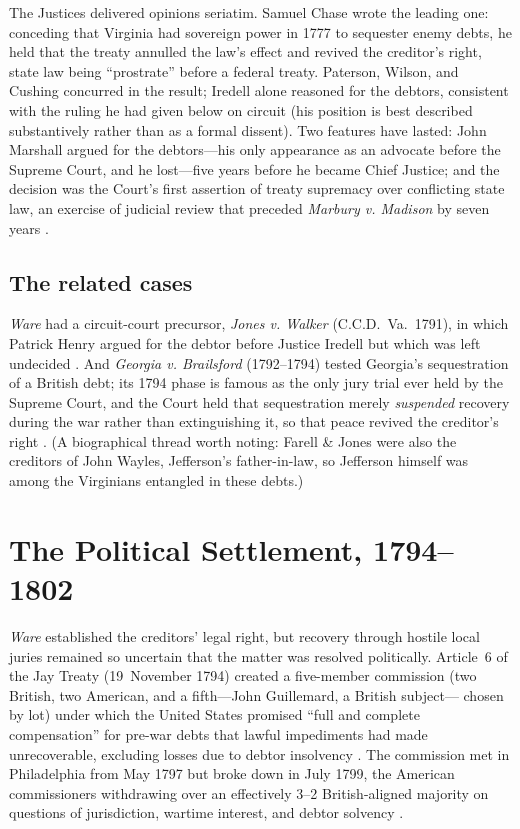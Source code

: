 \documentclass[12pt]{article}
\begin{document}
The Justices delivered opinions seriatim. Samuel Chase wrote the leading one:
conceding that Virginia had sovereign power in 1777 to sequester enemy debts, he
held that the treaty annulled the law's effect and revived the creditor's right,
state law being ``prostrate'' before a federal treaty. Paterson, Wilson, and
Cushing concurred in the result; Iredell alone reasoned for the debtors,
consistent with the ruling he had given below on circuit (his position is best
described substantively rather than as a formal dissent). Two features have lasted:
John Marshall argued for the debtors---his only appearance as an advocate before
the Supreme Court, and he lost---five years before he became Chief Justice; and the
decision was the Court's first assertion of treaty supremacy over conflicting
state law, an exercise of judicial review that preceded \emph{Marbury v. Madison}
by seven years \citep{warevhylton1796, hobson1996great, currie1985constitution,
goebel1971history}.

\subsection{The related cases}

\emph{Ware} had a circuit-court precursor, \emph{Jones v. Walker} (C.C.D.\ Va.\
1791), in which Patrick Henry argued for the debtor before Justice Iredell but
which was left undecided \citep{jonesvwalker1791, marshallpapers1987}. And
\emph{Georgia v. Brailsford} (1792--1794) tested Georgia's sequestration of a
British debt; its 1794 phase is famous as the only jury trial ever held by the
Supreme Court, and the Court held that sequestration merely \emph{suspended}
recovery during the war rather than extinguishing it, so that peace revived the
creditor's right \citep{georgiavbrailsford1794}. (A biographical thread worth
noting: Farell \& Jones were also the creditors of John Wayles, Jefferson's
father-in-law, so Jefferson himself was among the Virginians entangled in these
debts.)

\section{The Political Settlement, 1794--1802}
\label{sec:settlement}

\emph{Ware} established the creditors' legal right, but recovery through hostile
local juries remained so uncertain that the matter was resolved politically.
Article~6 of the Jay Treaty (19~November 1794) created a five-member commission
(two British, two American, and a fifth---John Guillemard, a British subject---
chosen by lot) under which the United States promised ``full and complete
compensation'' for pre-war debts that lawful impediments had made unrecoverable,
excluding losses due to debtor insolvency \citep{jaytreaty1794}. The commission
met in Philadelphia from May 1797 but broke down in July 1799, the American
commissioners withdrawing over an effectively 3--2 British-aligned majority on
questions of jurisdiction, wartime interest, and debtor solvency
\citep{bemis1923jay, ritcheson1969aftermath}.
\end{document}
